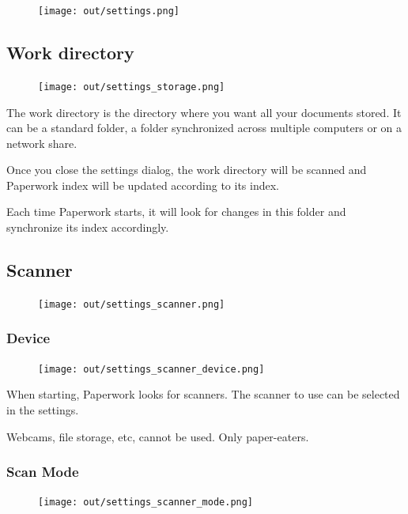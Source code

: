 \documentclass[10pt,a4paper]{article}
\begin{document}
\begin{figure}[H]
	\texttt{[image: out/settings.png]}
\end{figure}


\subsection{Work directory}

\begin{figure}[H]
	\texttt{[image: out/settings\_storage.png]}
\end{figure}

The work directory is the directory where you want all your documents stored.
It can be a standard folder, a folder synchronized across multiple computers
or on a network share.

Once you close the settings dialog, the work directory will be scanned and
Paperwork index will be updated according to its index.

Each time Paperwork starts, it will look for changes in this folder and
synchronize its index accordingly.


\subsection{Scanner}

\begin{figure}[H]
	\texttt{[image: out/settings\_scanner.png]}
\end{figure}


\subsubsection{Device}

\begin{figure}[H]
	\texttt{[image: out/settings\_scanner\_device.png]}
\end{figure}

When starting, Paperwork looks for scanners. The scanner to use can be selected
in the settings.

Webcams, file storage, etc, cannot be used. Only paper-eaters.


\subsubsection{Scan Mode}

\begin{figure}[H]
	\texttt{[image: out/settings\_scanner\_mode.png]}
\end{figure}
\end{document}

